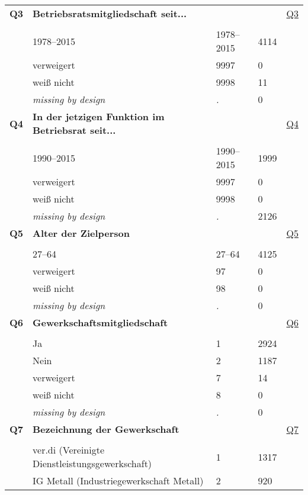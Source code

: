 \begin{longtable}{| L{2.65cm} | L{8cm} | C{1.5cm} | R{1.25cm} | C{2.25cm}  |}
   \midrule
\textbf{Q3}\label{var:Q3} & \textbf{Betriebsratsmitgliedschaft seit...} &  &  & \hyperref[Q3]{Q3} \\ 
   &  &  &  &  \\ 
   & 1978--2015 & 1978--2015 & 4114 &  \\ 
   & verweigert & 9997 & 0 &  \\ 
   & weiß nicht & 9998 & 11 &  \\ 
   & \textit{missing by design} & \textit{.} & 0 &  \\ 
   \midrule
\textbf{Q4}\label{var:Q4} & \textbf{In der jetzigen Funktion im Betriebsrat seit...} &  &  & \hyperref[Q4]{Q4} \\ 
   &  &  &  &  \\ 
   & 1990--2015 & 1990--2015 & 1999 &  \\ 
   & verweigert & 9997 & 0 &  \\ 
   & weiß nicht & 9998 & 0 &  \\ 
   & \textit{missing by design} & \textit{.} & 2126 &  \\ 
   \midrule
\textbf{Q5}\label{var:Q5} & \textbf{Alter der Zielperson} &  &  & \hyperref[Q5]{Q5} \\ 
   &  &  &  &  \\ 
   & 27--64 & 27--64 & 4125 &  \\ 
   & verweigert & 97 & 0 &  \\ 
   & weiß nicht & 98 & 0 &  \\ 
   & \textit{missing by design} & \textit{.} & 0 &  \\ 
   \midrule
\textbf{Q6}\label{var:Q6} & \textbf{Gewerkschaftsmitgliedschaft} &  &  & \hyperref[Q6]{Q6} \\ 
   &  &  &  &  \\ 
   & Ja & 1 & 2924 &  \\ 
   & Nein & 2 & 1187 &  \\ 
   & verweigert & 7 & 14 &  \\ 
   & weiß nicht & 8 & 0 &  \\ 
   & \textit{missing by design} & \textit{.} & 0 &  \\ 
   \midrule
\textbf{Q7}\label{var:Q7} & \textbf{Bezeichnung der Gewerkschaft} &  &  & \hyperref[Q7]{Q7} \\ 
   &  &  &  &  \\ 
   & ver.di (Vereinigte Dienstleistungsgewerkschaft) & 1 & 1317 &  \\ 
   & IG Metall (Industriegewerkschaft Metall) & 2 & 920 &  \\ 

\end{longtable}

